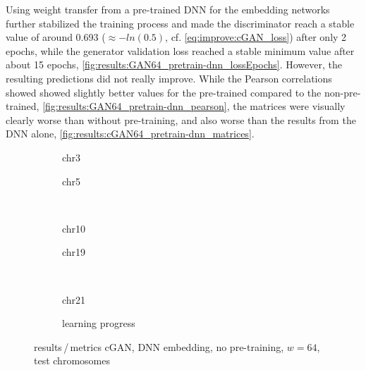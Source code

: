 Using weight transfer from a pre-trained DNN for the embedding networks further stabilized the training process 
and made the discriminator reach a stable value of around 0.693 ($\approx -ln(0.5)$, cf. \cref{eq:improve:cGAN_loss})
after only 2 epochs, while the generator validation loss reached a stable minimum value after about 15 epochs, \cref{fig:results:GAN64_pretrain-dnn_lossEpochs}.
However, the resulting predictions did not really improve.
While the Pearson correlations showed showed slightly better values for the pre-trained compared to the non-pre-trained, \cref{fig:results:GAN64_pretrain-dnn_pearson},
the matrices were visually clearly worse than without pre-training, and also worse than the results from the DNN alone, \cref{fig:results:cGAN64_pretrain-dnn_matrices}.

\begin{figure}[p] %
    \begin{subfigure}{0.45\textwidth}
        \scriptsize
        \caption{chr3}
    \end{subfigure} \hfill
    \begin{subfigure}{0.45\textwidth}
        \scriptsize
        \caption{chr5}
    \end{subfigure}\\[5mm]
    \begin{subfigure}{0.45\textwidth}
        \scriptsize
        \caption{chr10}
    \end{subfigure}\hfill
    \begin{subfigure}{0.45\textwidth}
        \scriptsize
        \caption{chr19}
    \end{subfigure}\\[3mm]
    \begin{subfigure}{0.45\textwidth}
        \scriptsize
        \caption{chr21}
    \end{subfigure} \hfill
    \begin{subfigure}{0.45\textwidth}
        \scriptsize
        \caption{learning progress} \label{fig:results:GAN64-dnn_lossEpochs}
    \end{subfigure}
    \caption{results\,/\,metrics cGAN, DNN embedding, no pre-training, $w=64$, test chromosomes}   \label{fig:results:GAN64-dnn_pearson}
\end{figure}
